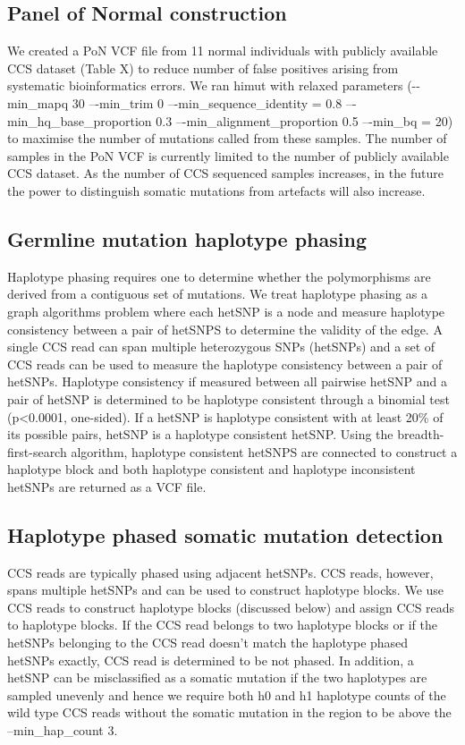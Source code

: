 \subsection{Panel of Normal construction}

We created a PoN VCF file from 11 normal individuals with publicly available CCS dataset (Table X) to reduce number of false positives arising from systematic bioinformatics errors. We ran himut with relaxed parameters (-{}-min\_mapq 30 –{}-min\_trim 0 –{}-min\_sequence\_identity = 0.8 –{}-min\_hq\_base\_proportion 0.3 –{}-min\_alignment\_proportion 0.5 –{}-min\_bq = 20) to maximise the number of mutations called from these samples. The number of samples in the PoN VCF is currently limited to the number of publicly available CCS dataset. As the number of CCS sequenced samples increases, in the future the power to distinguish somatic mutations from artefacts will also increase.  

\subsection{Germline mutation haplotype phasing}

Haplotype phasing requires one to determine whether the polymorphisms are derived from a contiguous set of mutations. We treat haplotype phasing as a graph algorithms problem where each hetSNP is a node and measure haplotype consistency between a pair of hetSNPS to determine the validity of the edge. A single CCS read can span multiple heterozygous SNPs (hetSNPs) and a set of CCS reads can be used to measure the haplotype consistency between a pair of hetSNPs. Haplotype consistency if measured between all pairwise hetSNP and a pair of hetSNP is determined to be haplotype consistent through a binomial test (p<0.0001, one-sided). If a hetSNP is haplotype consistent with at least 20\% of its possible pairs, hetSNP is a haplotype consistent hetSNP. Using the breadth-first-search algorithm, haplotype consistent hetSNPS are connected to construct a haplotype block and both haplotype consistent and haplotype inconsistent hetSNPs are returned as a VCF file. 

\subsection{Haplotype phased somatic mutation detection}

CCS reads are typically phased using adjacent hetSNPs. CCS reads, however, spans multiple hetSNPs and can be used to construct haplotype blocks. We use CCS reads to construct haplotype blocks (discussed below) and assign CCS reads to haplotype blocks. If the CCS read belongs to two haplotype blocks or if the hetSNPs belonging to the CCS read doesn’t match the haplotype phased hetSNPs exactly, CCS read is determined to be not phased. In addition, a hetSNP can be misclassified as a somatic mutation if the two haplotypes are sampled unevenly and hence we require both h0 and h1 haplotype counts of the wild type CCS reads without the somatic mutation in the region to be above the --min\_hap\_count 3. 

